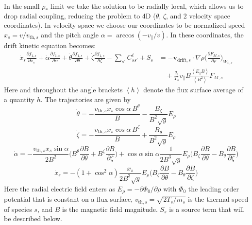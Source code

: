 \documentclass[11pt]{article}
\newcommand{\fsa}[1]{\left\langle #1 \right\rangle}
\begin{document}
In the small $\rho_*$ limit we take the solution to be radially local, which allows us
to drop radial coupling, reducing the problem to 4D
($\theta$, $\zeta$, and 2 velocity space coordinates). In velocity space we
choose our coordinates to be normalized speed $x_s = v/v_{\mathrm{th},s}$ and the pitch
angle $\alpha = \arccos(-v_{\parallel}/v)$. In these coordinates, the drift kinetic
equation becomes:
\begin{equation}
\begin{split}
\dot{x}_s \frac{\partial f_{1,s}}{\partial x_s}
+ \dot{\alpha} \frac{\partial f_{1,s}}{\partial \alpha}
+ \dot{\theta} \frac{\partial f_{1,s}}{\partial \theta}
+ \dot{\zeta} \frac{\partial f_{1,s}}{\partial \zeta}
- \sum_{s'} C^\ell_{ss'} + S_s
&= -\mathbf{v}_{\mathrm{drift},s} \cdot \nabla \rho
\Bigg(\frac{\partial F_{M,s}}{\partial \rho} \Bigg)_{W_{0,s}} \\
&\quad + \frac{q_s}{T_s}v_{\parallel}B
\frac{\fsa{E_{\parallel}B}}{\fsa{B^2}} F_{M,s}
\end{split}
\end{equation}
Here and throughout the angle brackets $\fsa{h}$ denote the flux surface
average of a quantity $h$. The trajectories are given by
\begin{equation}
\dot{\theta} = -\frac{v_{\mathrm{th},s} x_s \cos{\alpha}~ B^\theta}{B}
- \frac{B_\zeta}{B^2\sqrt{g}}E_\rho
\end{equation}
\begin{equation}
\dot{\zeta} = -\frac{v_{\mathrm{th},s} x_s \cos{\alpha} ~ B^\zeta}{B}
+ \frac{B_\theta}{B^2\sqrt{g}}E_\rho
\end{equation}
\begin{equation}
\dot{\alpha} = -\frac{v_{\mathrm{th},s} x_s\sin{\alpha}}{2 B^2}
\Bigg( B^\theta \frac{\partial B}{\partial \theta}
+ B^\zeta \frac{\partial B}{\partial \zeta} \Bigg)
+ \cos{\alpha} \sin{\alpha} \frac{1}{2B^3 \sqrt{g}} E_\rho
\Bigg( B_\zeta \frac{\partial B}{\partial \theta}
- B_\theta \frac{\partial B}{\partial \zeta} \Bigg)
\end{equation}
\begin{equation}
\dot{x}_s = -(1 + \cos^2 \alpha) \frac{x_s}{2B^3 \sqrt{g}} E_\rho
\Bigg( B_\zeta \frac{\partial B}{\partial \theta}
- B_\theta \frac{\partial B}{\partial \zeta} \Bigg)
\end{equation}
Here the radial electric field enters as
$E_\rho = - \partial \Phi_0 / \partial \rho$ with $\Phi_0$ the leading
order potential that is constant on a flux surface,
$v_{\mathrm{th},s} = \sqrt{2T_s/m_s}$ is the thermal speed of species $s$, and $B$ is the
magnetic field magnitude. $S_s$ is a source term that will be described below.
\end{document}
